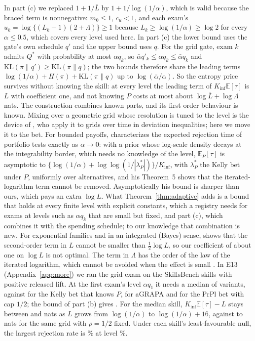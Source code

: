 In part (c) we replaced $1+1/\bar L$ by $1+1/\log(1/\alpha)$, which is valid because the braced term is nonnegative: $m_0\le1$, $c_u<1$, and each exam's $u_k=\log\{(L_k+1)(2+\Lambda)\}\ge1$ because $L_k\ge\log(1/\alpha)\ge\log2$ for every $\alpha\le0.5$, which covers every level used here. In part (c) the lower bound uses the gate's own schedule $q'$ and the upper bound uses $q$. For the grid gate, exam $k$ admits $Q^*$ with probability at most $\alpha q_k$, so $\bar\alpha q'_k\le\alpha q_k\le\bar\alpha q_k$ and $\mathrm{KL}(\pi\|q')\ge\mathrm{KL}(\pi\|q)$; the two bounds therefore share the leading terms $\log(1/\alpha)+H(\pi)+\mathrm{KL}(\pi\|q)$ up to $\log(\bar\alpha/\alpha)$. So the entropy price survives without knowing the skill: at every level the leading term of $K_{\inf}\mathbb E[\tau]$ is $L$ with coefficient one, and not knowing $P$ costs at most about $\log\bar L+\log\Lambda$ nats. The construction combines known parts, and its first-order behaviour is known. Mixing over a geometric grid whose resolution is tuned to the level is the device of \citet[proof of Theorem~33]{kaufmann2021mixture}, who apply it to grids over time in deviation inequalities; here we move it to the bet. For bounded payoffs, \citet[Theorem~2]{orabona2026optimal} characterizes the expected rejection time of portfolio tests exactly as $\alpha\to0$: with a prior whose log-scale density decays at the integrability border, which needs no knowledge of the level, $\mathbb E_P[\tau]$ is asymptotic to $\{\log(1/\alpha)+\log\log(1/|\lambda^*_P|)\}/K_{\inf}$, with $\lambda^*_P$ the Kelly bet under $P$, uniformly over alternatives, and his Theorem~5 shows that the iterated-logarithm term cannot be removed. Asymptotically his bound is sharper than ours, which pays an extra $\log L$. What Theorem~\ref{thm:adaptive} adds is a bound that holds at every finite level with explicit constants, which a registry needs for exams at levels such as $\alpha q_k$ that are small but fixed, and part (c), which combines it with the spending schedule; to our knowledge that combination is new. For exponential families and in an integrated (Bayes) sense, \citet{pollak1978optimality} shows that the second-order term in $L$ cannot be smaller than $\tfrac12\log L$, so our coefficient of about one on $\log L$ is not optimal. The term in $\Lambda$ has the order of the law of the iterated logarithm, which cannot be avoided when the effect is small \citep{farrell1964asymptotic,agrawal2025stopping,orabona2026optimal}.
In E13 (Appendix~\ref{app:more}) we ran the grid exam on the \NThHelpful{} SkillsBench skills with positive released lift. At the first exam's level $\alpha q_1$ it needs a median of \NAgGridQone{} variants, against \NAgKellyQone{} for the Kelly bet that knows $P$, \NAgAgrapaQone{} for aGRAPA and \NAgPrplQone{} for the PrPl bet with cap $1/2$; the bound of part (b) gives \NAgBoundQone. For the median skill, $K_{\inf}\mathbb E[\tau]-L$ stays between \NAgExcessMin{} and \NAgExcessMax{} nats as $L$ grows from $\log(1/\alpha)$ to $\log(1/\alpha)+16$, against \NAgFixedMin{} to \NAgFixedMax{} nats for the same grid with $\rho=1/2$ fixed. Under each skill's least-favourable null, the largest rejection rate is \NAgMaxReject\% at level \NAgLevelQone\%.

